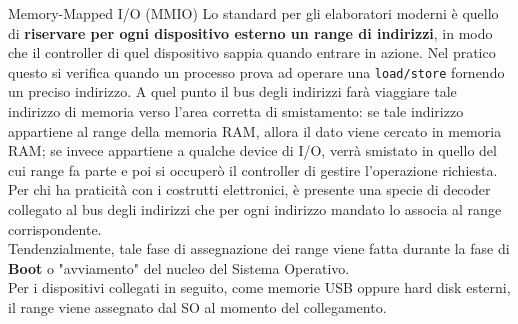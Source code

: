 \documentclass[12pt]{report}
\begin{document}
	\begin{definizione}{Memory-Mapped I/O (MMIO)}{}
		Lo standard per gli elaboratori moderni è quello di \textbf{riservare per ogni dispositivo esterno un range di indirizzi}, in modo che il controller di quel dispositivo sappia quando entrare in azione. Nel pratico questo si verifica quando un processo prova ad operare una \texttt{load/store} fornendo un preciso indirizzo. A quel punto il bus degli indirizzi farà viaggiare tale indirizzo di memoria verso l'area corretta di smistamento: se tale indirizzo appartiene al range della memoria RAM, allora il dato viene cercato in memoria RAM; se invece appartiene a qualche device di I/O, verrà smistato in quello del cui range fa parte e poi si occuperò il controller di gestire l'operazione richiesta.\\
		Per chi ha praticità con i costrutti elettronici, è presente una specie di decoder collegato al bus degli indirizzi che per ogni indirizzo mandato lo associa al range corrispondente.\\
		Tendenzialmente, tale fase di assegnazione dei range viene fatta durante la fase di \textbf{Boot} o "avviamento" del nucleo del Sistema Operativo.\\
		Per i dispositivi collegati in seguito, come memorie USB oppure hard disk esterni, il range viene assegnato dal SO al momento del collegamento.
	\end{definizione}
	
\end{document}
